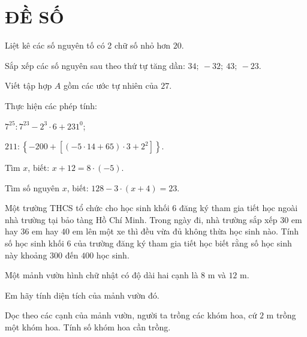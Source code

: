\section{ĐỀ SỐ \thesection }%
\setcounter{bt}{0}

\begin{bt}\textbf{ }
	\begin{listEX}
		\item Liệt kê các số nguyên tố có 2 chữ số nhỏ hơn $20$.
		\item Sắp xếp các số nguyên sau theo thứ tự tăng dần: $34 ;\ -32 ;\ 43 ;\ -23$.
		\item Viết tập hợp $A$ gồm các ước tự nhiên của $27$.
	\end{listEX}
\end{bt}



\begin{bt} Thực hiện các phép tính:
	\begin{listEX}[2]
		\item $7^{25}: 7^{23}-2^{3} \cdot6+231^{0}$;
		\item $211:\left\{-200+\left[(-5 \cdot 14+65) \cdot 3+2^{2}\right]\right\}$.
	\end{listEX}
\end{bt}

\begin{bt} \textbf{ }
	\begin{listEX}
		\item Tìm $x$, biết: $x+12=8 \cdot (-5)$.
		\item Tìm số nguyên $x$, biết: $128-3\cdot (x+4) = 23$.
		\item Một trường THCS tổ chức cho học sinh khối 6 đăng ký tham gia tiết học ngoài nhà trường tại bảo tàng Hồ Chí Minh. Trong ngày đi, nhà trường sắp xếp $30$ em hay $36$ em hay $40$ em lên một xe thì đều vừa đủ không thừa học sinh nào. Tính số học sinh khối 6 của trường đăng ký tham gia tiết học biết rằng số học sinh này khoảng $300$ đến $400$ học sinh.
	\end{listEX}
\end{bt}


\begin{bt} Một mảnh vườn hình chữ nhật có độ dài hai cạnh là $8$ m và $12$ m.
	\begin{listEX}
		\item Em hãy tính diện tích của mảnh vườn đó.
		\item Dọc theo các cạnh của mảnh vườn, người ta trồng các khóm hoa, cứ $2$ m trồng một khóm hoa. Tính số khóm hoa cần trồng.
	\end{listEX}
\end{bt}

